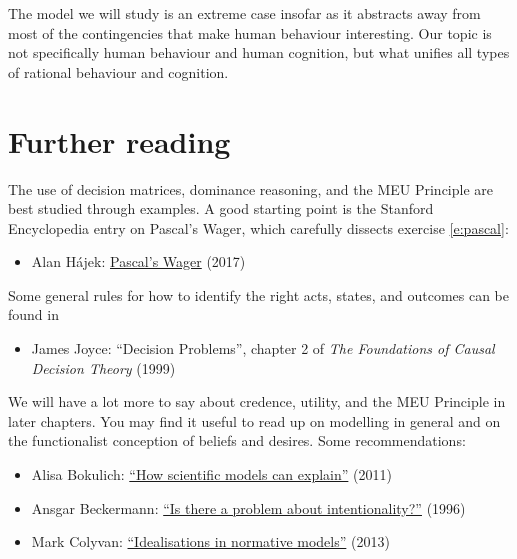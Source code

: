The model we will study is an extreme case insofar as it abstracts
away from most of the contingencies that make human behaviour
interesting. Our topic is not specifically human behaviour and human
cognition, but what unifies all types of rational behaviour and
cognition.

\section{Further reading}

The use of decision matrices, dominance reasoning, and the MEU
Principle are best studied through examples. A good starting point is
the Stanford Encyclopedia entry on Pascal's Wager, which carefully
dissects exercise \ref{e:pascal}:

\begin{itemize}
\item Alan H\'ajek: \href{http://plato.stanford.edu/entries/pascal-wager/}{Pascal's Wager} (2017)
\end{itemize}

Some general rules for how to identify the right acts, states, and
outcomes can be found in

\begin{itemize}
\item James Joyce: ``Decision Problems'', chapter 2 of \emph{The
    Foundations of Causal Decision Theory} (1999)
\end{itemize}

We will have a lot more to say about credence, utility, and the MEU
Principle in later chapters. You may find it useful to read up on
modelling in general and on the functionalist conception of beliefs
and desires. Some recommendations:

\begin{itemize}
  \itemsep0em 

\item Alisa Bokulich: \href{http://www.romanfrigg.org/Links/MS2/Bokulich.pdf}{``How scientific models can explain''} (2011)

\item Ansgar Beckermann:
  \href{https://www.uni-bielefeld.de/(en)/philosophie/personen/beckermann/pbint_ve.pdf}{``Is
    there a problem about intentionality?''} (1996)

\item Mark Colyvan: \href{http://www.colyvan.com/papers/iinm.pdf}{``Idealisations in normative models''} (2013)

  
\end{itemize}

